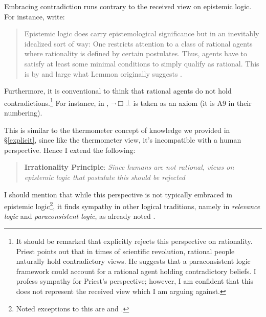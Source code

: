 \documentclass[11pt]{article}
\numberwithin{equation}{subsection}
\begin{document}
Embracing contradiction runs contrary to the received view on epistemic logic.  For instance, \citet{hendricks_wheresbridge?_2006} write:
\begin{quote}
{ Epistemic logic does carry epistemological significance
 but in an inevitably idealized sort of way: One restricts attention to a
class of rational agents where rationality is defined by certain
postulates. Thus, agents have to satisfy at least some minimal
conditions to simply qualify as rational. This is by and large
what Lemmon originally suggests \citep{lemmon_symposium:_1959}.}
\end{quote}
Furthermore, it is conventional to think that rational agents do not hold contradictions.\footnote{It should be remarked that \citet{priest_doubt_2006} explicitly rejects this perspective on rationality.  Priest points out that in times of scientific revolution, rational people naturally hold contradictory views. He suggests that a paraconsistent logic framework could account for a rational agent holding contradictory beliefs.  I profess sympathy for Priest's perspective; however, I am confident that this does not represent the received view which I am arguing against.}  For instance, in \citep{kraus_knowledge_1986}, $\neg \Box \bot$ is taken as an axiom (it is A9 in their numbering).

This is similar to the thermometer concept of knowledge we provided in \S\ref{explicit}, since like the thermometer view, it's incompatible with a human perspective.  Hence I extend the following:

\begin{quote}
 \textbf{Irrationality Principle}: \emph{Since humans are not rational, views on epistemic logic that postulate this should be rejected}
\end{quote}

I should mention that while this perspective is not typically embraced in epistemic logic\footnote{Noted exceptions to this are \citet{rantala_impossible_1982} and \citet{levesque_logic_1984}.}, it finds sympathy in other logical traditions, namely in \emph{relevance logic} and \emph{paraconsistent logic}, as already noted \citep[see][chapters 1 \& 4]{gabbay_handbook_2002}.
\end{document}
